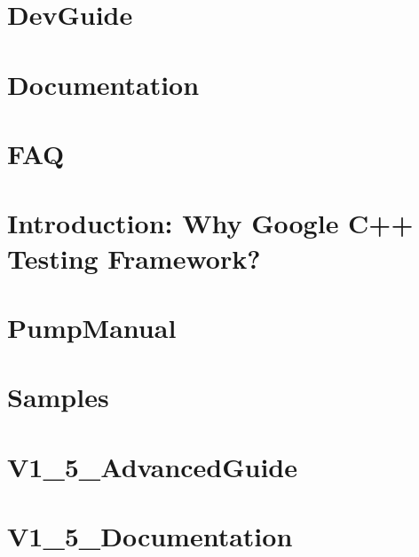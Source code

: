 \documentclass[twoside]{book}
\newcommand{\+}{\discretionary{\mbox{\scriptsize$\hookleftarrow$}}{}{}}
\begin{document}
\chapter{Dev\+Guide}
\label{md_vendor_googletest_googletest_docs__dev_guide}

\chapter{Documentation}
\label{md_vendor_googletest_googletest_docs__documentation}

\chapter{F\+AQ}
\label{md_vendor_googletest_googletest_docs__f_a_q}

\chapter{Introduction\+: Why Google C++ Testing Framework?}
\label{md_vendor_googletest_googletest_docs__primer}

\chapter{Pump\+Manual}
\label{md_vendor_googletest_googletest_docs__pump_manual}

\chapter{Samples}
\label{md_vendor_googletest_googletest_docs__samples}

\chapter{V1\+\_\+5\+\_\+\+Advanced\+Guide}
\label{md_vendor_googletest_googletest_docs__v1_5__advanced_guide}

\chapter{V1\+\_\+5\+\_\+\+Documentation}
\label{md_vendor_googletest_googletest_docs__v1_5__documentation}

\end{document}

